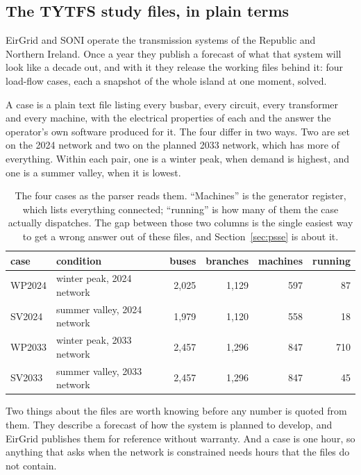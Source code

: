 \documentclass[11pt,a4paper]{article}
\begin{document}
\subsection{The TYTFS study files, in plain terms}

EirGrid and SONI operate the transmission systems of the Republic and Northern
Ireland. Once a year they publish a forecast of what that system will look
like a decade out, and with it they release the working files behind it: four
load-flow cases, each a snapshot of the whole island at one moment, solved.

A case is a plain text file listing every busbar, every circuit, every
transformer and every machine, with the electrical properties of each and the
answer the operator's own software produced for it. The four differ in two
ways. Two are set on the 2024 network and two on the planned 2033 network,
which has more of everything. Within each pair, one is a winter peak, when
demand is highest, and one is a summer valley, when it is lowest.

\begin{table}[H]\centering\small
\begin{tabular}{llrrrr}
\toprule
\textbf{case} & \textbf{condition} & \textbf{buses} & \textbf{branches} &
\textbf{machines} & \textbf{running} \\
\midrule
WP2024 & winter peak, 2024 network   & 2{,}025 & 1{,}129 & 597 & 87 \\
SV2024 & summer valley, 2024 network & 1{,}979 & 1{,}120 & 558 & 18 \\
WP2033 & winter peak, 2033 network   & 2{,}457 & 1{,}296 & 847 & 710 \\
SV2033 & summer valley, 2033 network & 2{,}457 & 1{,}296 & 847 & 45 \\
\bottomrule
\end{tabular}
\caption{The four cases as the parser reads them. ``Machines'' is the
generator register, which lists everything connected; ``running'' is how many
of them the case actually dispatches. The gap between those two columns is the
single easiest way to get a wrong answer out of these files, and
Section~\ref{sec:psse} is about it.}
\end{table}

Two things about the files are worth knowing before any number is quoted from
them. They describe a forecast of how the system is planned to develop, and
EirGrid publishes them for reference without warranty. And a case
is one hour, so anything that asks when the network is constrained needs hours
that the files do not contain.
\end{document}
